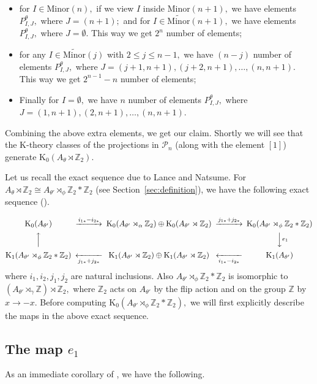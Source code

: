 \documentclass[9pt, BCOR=2mm]{amsart}
\numberwithin{equation}{section}
\numberwithin{equation}{section}
\newcommand{\Z}{{\mathbb{Z}}}
\newcommand{\K}{\mathrm{K}} %
\begin{document}
\begin{itemize}
	\item for $I\in \mathrm{Minor}(n),$ if we view $I$ inside  $\mathrm{Minor}(n+1),$ we have elements $P_{I,J}^{\theta},$ where $J=(n+1);$ and for $I\in \widetilde{\mathrm{Minor}}(n+1),$ we have elements $P_{I,J}^{\theta},$ where $J=\emptyset.$ This way we get $2^n$ number of elements;
	\item for any $I\in \widetilde{\mathrm{Minor}}(j)$ with $2\le j \le n-1,$ we have $(n-j)$ number of elements $P_{I,J}^{\theta},$ where $J=(j+1,n+1), (j+2,n+1), \ldots ,(n,n+1).$ This way we get 
	$2^{n-1}-n$ number of elements;
	\item Finally for $I=\emptyset,$ we have $n$ number of elements $P_{I,J}^{\theta},$ where $J=(1,n+1), (2,n+1), \ldots ,(n,n+1).$ 
	\end{itemize}    
Combining the above extra elements, we get our claim. Shortly we will see that the K-theory classes of the projections in $\mathcal{P}_n$ (along with the element $[1]$)  generate $\K_0(A_\theta\rtimes \Z_2).$ 
	 
	 
	Let us recall the exact sequence due to Lance and Natsume. For $A_\theta\rtimes \Z_2 \cong A_{\theta'}\rtimes_\phi \Z_2 *  \Z_2$ (see Section~\ref{sec:definition}), we have the following exact sequence (\cite{Nat85}).
	
	{\small \[
\begin{CD}
\K_0 (A_{\theta'}) @>{i_{1*}-i_{2*}}>>\K_0 (A_{\theta'}\rtimes_\alpha  \Z_2)\oplus \K_0 (A_{\theta'}\rtimes \Z_2)@>{j_{1*}+j_{2*}}>> \K_0 (A_{\theta'}\rtimes_\phi \Z_2*\Z_2)   \\
@A{}AA & &  @VV{e_1}V            \\
 \K_1 (A_{\theta'}\rtimes_\phi \Z_2*\Z_2) @<<{j_{1*}+j_{2*}}<  \K_1 (A_{\theta'}\rtimes \Z_2)\oplus \K_1 (A_{\theta'}\rtimes \Z_2) @<<{i_{1*}-i_{2*}}< \K_1 (A_{\theta'})
\end{CD}
\]}where $i_1, i_2, j_1,j_2$ are natural inclusions.          
	Also $A_{\theta'}\rtimes_\phi \Z_2 *  \Z_2$ is isomorphic to 	$(A_{\theta'}\rtimes_\gamma \Z)\rtimes\Z_2,$ where $\Z_2$ acts on $A_{\theta'}$ by the flip action and on the group $\Z$ by $x\rightarrow -x.$ Before computing $\K_0 (A_{\theta'}\rtimes_\phi \Z_2*\Z_2),$ we will first explicitly describe the maps in the above exact sequence. 
	
	
	\subsection*{The map $e_1$}
	As an immediate corollary of \cite[Theorem 7.1]{CL19}, we have the following.
	
\end{document}
